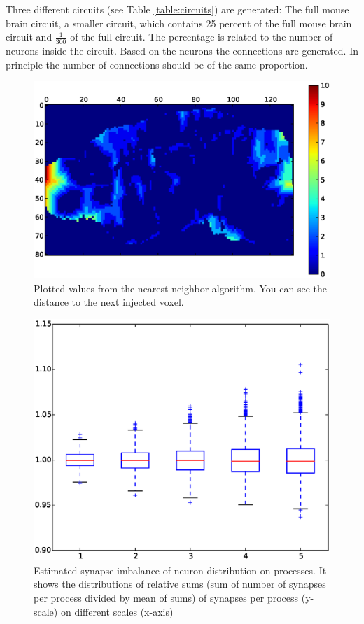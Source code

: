 \label{table:circuits}

Three different circuits (see Table \ref{table:circuits}) are generated: The full mouse brain circuit,
a smaller circuit, which contains 25 percent of the full mouse brain circuit and
$\frac{1}{300}$ of the full circuit. The percentage is related to the number of neurons inside
the circuit. Based on the neurons the connections are generated. In principle the
number of connections should be of the same proportion.


\begin{figure}[ht!]
\centering
\includegraphics[scale=0.5]{pictures/distance_x_y_70.eps}
\caption{Plotted values from the nearest neighbor algorithm. You can see the distance to the next injected voxel.}
\label{interpolationdistance}
\end{figure}

\begin{figure}[ht!]
\centering
\includegraphics[scale=0.4]{pictures/full_circuit_rack_distribution.eps}
\caption{Estimated synapse imbalance of neuron distribution on processes.
It shows the distributions of relative sums (sum of number of synapses per process divided by mean of sums) of synapses per process (y-scale) on different scales (x-axis) }
\label{fullcircuitdist}
\end{figure}

